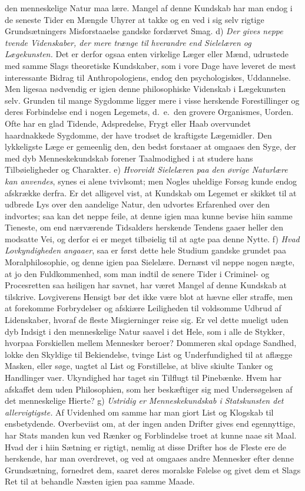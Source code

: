 \documentclass[12pt,a4paper]{article}
\newcommand{\opage}[1]{\marginnote{\footnotesize\textit{[#1]}}}
\begin{document}
den menneskelige Natur maa lære. Mangel af denne Kundskab har man endog i de
seneste Tider en Mængde Uhyrer at takke og en ved i sig selv rigtige
Grundsætningers Misforstaaelse gandske fordærvet Smag. d) \emph{Der gives neppe
tvende Videnskaber, der mere trænge til hverandre end Sielelæren og Lægekunsten.}
Det er derfor ogsaa
\opage{8} enten virkelige Læger eller Mænd, udrustede med samme Slags theoretiske
Kundskaber, som i vore Dage have leveret de mest interessante Bidrag til
Anthropologiens, endog den psychologiskes, Uddannelse. Men ligesaa nødvendig er
igien denne philosophiske Videnskab i Lægekunsten selv. Grunden til mange
Sygdomme ligger mere i visse herskende Forestillinger og deres Forbindelse end i
nogen Legemets, d.~e.\ den grovere Organismes, Uorden. Ofte har en glad Tidende,
Adspredelse, Frygt eller Haab overvundet haardnakkede Sygdomme, der have trodset
de kraftigste Lægemidler. Den lykkeligste Læge er gemeenlig den, den bedst
forstaaer at omgaaes den Syge, der med dyb Menneskekundskab forener Taalmodighed i
at studere hans Tilbøieligheder og Charakter. e) \emph{Hvorvidt Sielelæren paa den
øvrige Naturlære kan anvendes}, synes ei alene tvivlsomt; men Nogles uheldige
Forsøg kunde endog afskrække derfra. Er det alligevel vist, at Kundskab om
Legemet er skikket til at udbrede Lys over den aandelige Natur, den udvortes
Erfarenhed over den indvortes; saa kan det neppe feile, at denne igien maa kunne
bevise hiin samme Tieneste, om end nærværende Tidsalders herskende Tendens gaaer
heller den modsatte Vei, og derfor ei er meget tilbøielig til at agte paa denne
Nytte.
\opage{9} f) \emph{Hvad Lovkyndigheden angaaer}, saa er først dette hele Studium gandske
grundet paa Moralphilosophie, og denne igien paa Sielelære. Dernæst vil neppe
nogen nægte, at jo den Fuldkommenhed, som man indtil de senere Tider i Criminel-
og Procesretten saa høiligen har savnet, har været Mangel af denne Kundskab at
tilskrive. Lovgiverens Hensigt bør det ikke være blot at hævne eller straffe, men
at forekomme Forbrydelser og afskiære Leiligheden til voldsomme Udbrud af
Lidenskaber, hvoraf de fleste Misgierninger reise sig. Er vel dette mueligt uden
dyb Indsigt i den menneskelige Natur saavel i det Hele, som i alle de Stykker,
hvorpaa Forskiellen mellem Mennesker beroer? Dommeren skal opdage Sandhed, lokke
den Skyldige til Bekiendelse, tvinge List og Underfundighed til at aflægge Masken,
eller søge, uagtet al List og Forstillelse, at blive skiulte Tanker og Handlinger
vaer. Ukyndighed har taget sin Tilflugt til Pinebænke. Hvem har afskaffet dem uden
Philosophien, som her beskæftiger sig med Undersøgelsen af det menneskelige
Hierte? g) \emph{Ustridig er Menneskekundskab i Statskunsten det allervigtigste.}
Af Uvidenhed om samme har man giort List og Klogskab til ensbetydende. Overbeviist
om, at der ingen anden Drifter gives end egennyttige, har Stats%
\opage{10}manden kun ved Rænker og Forblindelse troet at kunne naae sit Maal. Hvad der i
hiin Sætning er rigtigt, nemlig at disse Drifter hos de Fleste ere de herskende,
har man overdrevet, og ved at omgaaes andre Mennesker efter denne Grundsætning,
fornedret dem, saaret deres moralske Følelse og givet dem et Slags Ret til at
behandle Næsten igien paa samme Maade.
\end{document}
